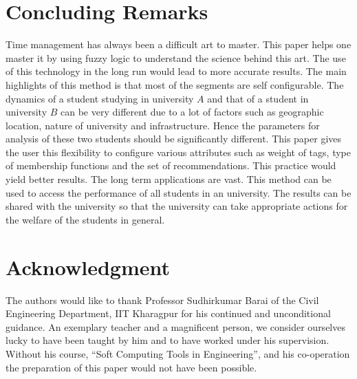 \documentclass[conference]{IEEEtran}
\newcommand{\quotes}[1]{``#1''}
\begin{document}
%

\section{Concluding Remarks}
Time management has always been a difficult art to master. This paper helps one master it by using fuzzy logic to understand the science behind this art. The use of this technology in the long run would lead to more accurate results. The main highlights of this method is that most of the segments are self configurable. The dynamics of a student studying in university $A$ and that of a student in university $B$ can be very different due to a lot of factors such as geographic location, nature of university and infrastructure. Hence the parameters for analysis of these two students should be significantly different. This paper gives the user this flexibility to configure various attributes such as weight of tags, type of membership functions and the set of recommendations. This practice would yield better results.
The long term applications are vast. This method can be used to access the performance of all students in an university. The results can be shared with the university so that the university can take appropriate actions for the welfare of the students in general.
\section*{Acknowledgment}
The authors would like to thank Professor Sudhirkumar Barai of the Civil Engineering Department, IIT Kharagpur for his continued and unconditional guidance. An exemplary teacher and a magnificent person, we consider ourselves lucky to have been taught by him and to have worked under his supervision. Without his course, \quotes{Soft Computing Tools in Engineering}, and his co-operation the preparation of this paper would not have been possible.
\end{document}
